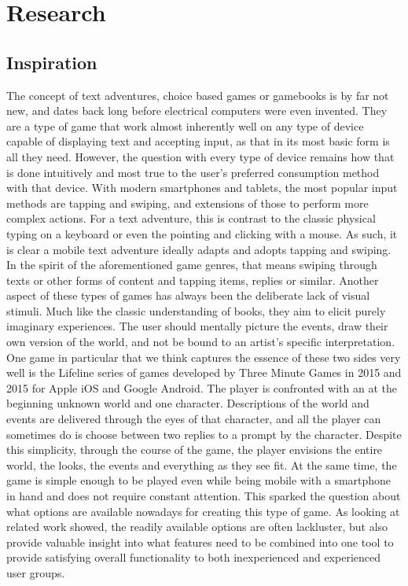 
\chapter{Research}\label{chapter:research}

\section{Inspiration}
The concept of text adventures, choice based games or gamebooks is by far not new, and dates back long before electrical computers were even invented. They are a type of game that work almost inherently well on any type of device capable of displaying text and accepting input, as that in its most basic form is all they need. However, the question with every type of device remains how that is done intuitively and most true to the user's preferred consumption method with that device. With modern smartphones and tablets, the most popular input methods are tapping and swiping, and extensions of those to perform more complex actions. For a text adventure, this is contrast to the classic physical typing on a keyboard or even the pointing and clicking with a mouse. As such, it is clear a mobile text adventure ideally adapts and adopts tapping and swiping. In the spirit of the aforementioned game genres, that means swiping through texts or other forms of content and tapping items, replies or similar. 
Another aspect of these types of games has always been the deliberate lack of visual stimuli. Much like the classic understanding of books, they aim to elicit purely imaginary experiences. The user should mentally picture the events, draw their own version of the world, and not be bound to an artist's specific interpretation. 
One game in particular that we think captures the essence of these two sides very well is the Lifeline series of games developed by Three Minute Games in 2015 and 2015 for Apple iOS and Google Android. The player is confronted with an at the beginning unknown world and one character. Descriptions of the world and events are delivered through the eyes of that character, and all the player can sometimes do is choose between two replies to a prompt by the character. Despite this simplicity, through the course of the game, the player envisions the entire world, the looks, the events and everything as they see fit. At the same time, the game is simple enough to be played even while being mobile with a smartphone in hand and does not require constant attention. 
This sparked the question about what options are available nowadays for creating this type of game. As looking at related work showed, the readily available options are often lackluster, but also provide valuable insight into what features need to be combined into one tool to provide satisfying overall functionality to both inexperienced and experienced user groups.

